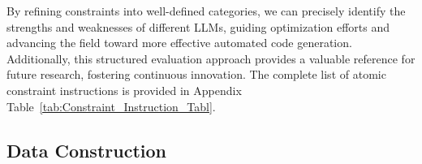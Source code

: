 By refining constraints into well-defined categories, we can precisely identify the strengths and weaknesses of different LLMs, guiding optimization efforts and advancing the field toward more effective automated code generation. Additionally, this structured evaluation approach provides a valuable reference for future research, fostering continuous innovation. The complete list of atomic constraint instructions is provided in Appendix Table~\ref{tab:Constraint_Instruction_Tabl}.



\subsection{Data Construction}
\label{sec:Data_Construction}


